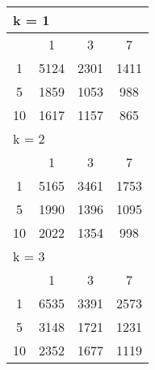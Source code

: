 \begin{table}
\begin{tabular}{|*4{c|}}
\hline
\multicolumn{4}{|l|}{k = 1} \\
\hline
\diagbox{$\mu$}{$\lambda$} & \multicolumn{1}{c|}{1} & \multicolumn{1}{c|}{3} & \multicolumn{1}{c|}{7} \\
\hline
1 & 5124 & 2301 & 1411 \\
\hline
5 & 1859 & 1053 & 988 \\
\hline
10 & 1617 & 1157 & 865 \\
\hline
\multicolumn{4}{|l|}{k = 2} \\
\hline
\diagbox{$\mu$}{$\lambda$} & \multicolumn{1}{c|}{1} & \multicolumn{1}{c|}{3} & \multicolumn{1}{c|}{7} \\
\hline
1 & 5165 & 3461 & 1753 \\
\hline
5 & 1990 & 1396 & 1095 \\
\hline
10 & 2022 & 1354 & 998 \\
\hline
\multicolumn{4}{|l|}{k = 3} \\
\hline
\diagbox{$\mu$}{$\lambda$} & \multicolumn{1}{c|}{1} & \multicolumn{1}{c|}{3} & \multicolumn{1}{c|}{7} \\
\hline
1 & 6535 & 3391 & 2573 \\
\hline
5 & 3148 & 1721 & 1231 \\
\hline
10 & 2352 & 1677 & 1119 \\
\hline
\end{tabular}
\end{table}


